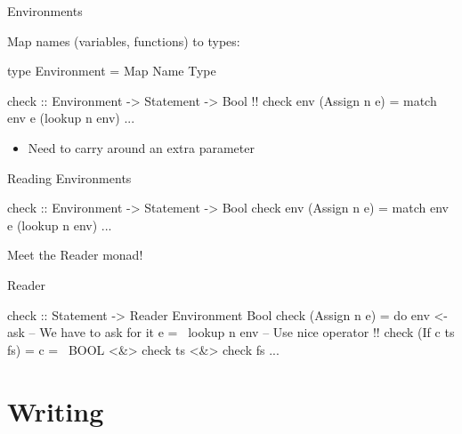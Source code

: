 \begin{frame}[fragile]{Environments}

  Map names (variables, functions) to types:

    \begin{HASKELL}
      type Environment = Map Name Type
    \end{HASKELL}
    
  \pause
  
  \begin{block}{}
    \begin{HASKELL}
      check :: Environment -> Statement -> Bool !\pause!
      check env (Assign n e) = match env e (lookup n env)
      ...
    \end{HASKELL}
  \end{block}
  
  \pause

  \begin{itemize}
    \item Need to carry around an extra parameter \frownie
  \end{itemize}

\end{frame}

\begin{frame}[fragile]{Reading Environments}
  
  \begin{block}{}
    \begin{HASKELL}
      check :: Environment -> Statement -> Bool
      check env (Assign n e) = match env e (lookup n env)
      ...
    \end{HASKELL}
  \end{block}
  
  Meet the Reader monad!

  \begin{block}{Reader}
    \begin{HASKELL}
      check :: Statement -> Reader Environment Bool
      check (Assign n e) = do
        env <- ask            -- We have to ask for it
        e =~ lookup n env     -- Use nice operator !\pause!
      check (If c ts fs) = c =~ BOOL <&> check ts <&> check fs
      ...
    \end{HASKELL}
  \end{block}

\end{frame}

\section{Writing}
